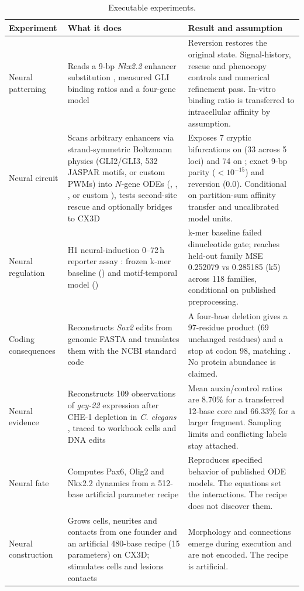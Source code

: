 \documentclass[10.5pt,a4paper]{article}
\begin{document}
\begin{table}[tb]
\small
\caption{Executable experiments.}\label{tab:experiments}
\begin{tabular}{@{}L{24mm}L{56mm}L{68mm}@{}}
\toprule
Experiment & What it does & Result and assumption \\
\midrule
Neural patterning & Reads a 9-bp \emph{Nkx2.2} enhancer substitution \citep{peterson2012}, measured GLI binding ratios \citep{hallikas2006} and a four-gene model \citep{herreradelgado2020,cohen2014} & Reversion restores the original state. Signal-history, rescue and phenocopy controls and numerical refinement pass. In-vitro binding ratio is transferred to intracellular affinity by assumption. \\
Neural circuit & Scans arbitrary enhancers via strand-symmetric Boltzmann physics (GLI2/GLI3, 532 JASPAR motifs, or custom PWMs) into $N$-gene ODEs (, , , or custom ), tests second-site rescue and optionally bridges to CX3D & Exposes 7 cryptic bifurcations on  (33 across 5 loci) and 74 on ; exact 9-bp parity ($<10^{-15}$) and reversion ($0.0$). Conditional on partition-sum affinity transfer and uncalibrated model units. \\
Neural regulation & H1 neural-induction 0–72\,h reporter assay \citep{kreimer2022}: frozen k-mer baseline () and motif-temporal model () & k-mer baseline failed dinucleotide gate;  reaches held-out family MSE 0.252079 vs 0.285185 (k5) across 118 families, conditional on published preprocessing. \\
Coding consequences & Reconstructs \emph{Sox2} edits from genomic FASTA and translates them with the NCBI standard code & A four-base deletion gives a 97-residue product (69 unchanged residues) and a stop at codon 98, matching \citet{gong2020}. No protein abundance is claimed. \\
Neural evidence & Reconstructs 109 observations of \emph{gcy-22} expression after CHE-1 depletion in \emph{C. elegans} \citep{traets2021}, traced to workbook cells and DNA edits & Mean auxin/control ratios are 8.70\% for a transferred 12-base core and 66.33\% for a larger fragment. Sampling limits and conflicting labels stay attached. \\
Neural fate & Computes Pax6, Olig2 and Nkx2.2 dynamics from a 512-base artificial parameter recipe & Reproduces specified behavior of published ODE models. The equations set the interactions. The recipe does not discover them. \\
Neural construction & Grows cells, neurites and contacts from one founder and an artificial 480-base recipe (15 parameters) on CX3D; stimulates cells and lesions contacts & Morphology and connections emerge during execution and are not encoded. The recipe is artificial. \\
\bottomrule
\end{tabular}
\end{table}
\end{document}
